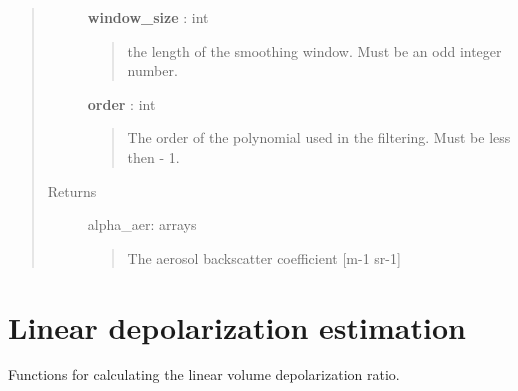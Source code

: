 \documentclass[letterpaper,10pt,english]{sphinxmanual}
\begin{document}
\begin{fulllineitems}
\begin{quote}
\begin{description}
\textbf{window\_size} : int
\begin{quote}

the length of the smoothing window. Must be an odd integer number.
\end{quote}

\textbf{order} : int
\begin{quote}

The order of the polynomial used in the filtering.
Must be less then  - 1.
\end{quote}

\item[{Returns}] \leavevmode
alpha\_aer: arrays
\begin{quote}

The aerosol backscatter coefficient {[}m-1 sr-1{]}
\end{quote}

\end{description}\end{quote}

\end{fulllineitems}



\chapter{Linear depolarization estimation}
\label{depolarization:linear-depolarization-estimation}\label{depolarization::doc}\label{depolarization:module-depolarization}
Functions for calculating the linear volume depolarization ratio.
\end{document}
